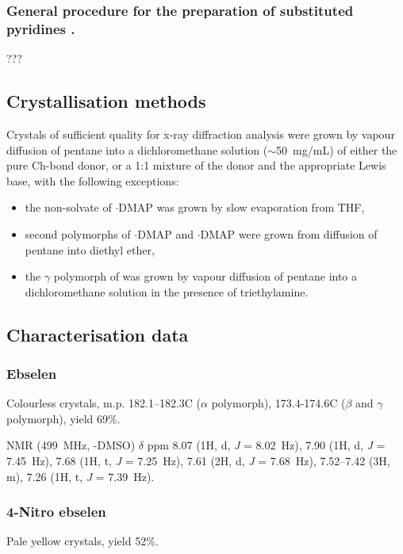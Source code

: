 \begin{refsection}
\subsubsection[General procedure for substituted pyridines]{General procedure for the preparation of substituted pyridines .}
???


\subsection{Crystallisation methods}
Crystals of sufficient quality for x-ray diffraction analysis were grown by vapour diffusion of pentane into a dichloromethane solution ($\sim$50~mg/mL) of either the pure Ch-bond donor, or a 1:1 mixture of the donor and the appropriate Lewis base, with the following exceptions:
\begin{itemize}
    \item the non-solvate of $ \cdot $DMAP was grown by slow evaporation from THF,
    \item second polymorphs of $ \cdot $DMAP and $ \cdot $DMAP were grown from diffusion of pentane into diethyl ether,
    \item the $\gamma$ polymorph of  was grown by vapour diffusion of pentane into a dichloro\-methane solution in the presence of triethylamine.
\end{itemize}

\subsection{Characterisation data}

\subsubsection{Ebselen }
Colourless crystals, m.p. 182.1--182.3\degree{}C ($\alpha$ polymorph), 173.4-174.6\degree{}C ($\beta$ and $\gamma$ polymorph), yield 69\%.

 NMR (499~MHz, -DMSO) $ \delta $ ppm 8.07 (1H, d, \textit{J} = 8.02~Hz), 7.90 (1H, d, \textit{J} = 7.45~Hz), 7.68 (1H, t, \textit{J} = 7.25~Hz), 7.61 (2H, d, \textit{J} = 7.68~Hz), 7.52--7.42 (3H, m), 7.26 (1H, t, \textit{J} = 7.39~Hz).

\subsubsection{4-Nitro ebselen }
Pale yellow crystals, yield 52\%.


\end{refsection}
